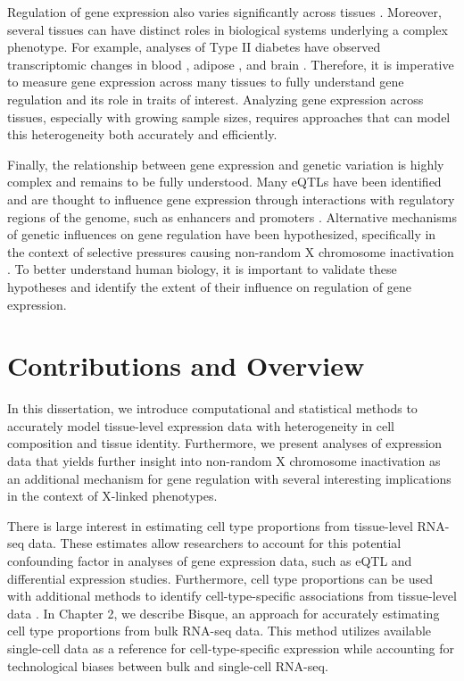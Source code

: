 Regulation of gene expression also varies significantly across tissues \cite{GTEx_Consortium2020-xx}. Moreover, several tissues can have distinct roles in biological systems underlying a complex phenotype. For example, analyses of Type II diabetes have observed transcriptomic changes in blood \cite{Christodoulou2019}, adipose \cite{Miao2020}, and brain \cite{Zhou2019}. Therefore, it is imperative to measure gene expression across many tissues to fully understand gene regulation and its role in traits of interest. Analyzing gene expression across tissues, especially with growing sample sizes, requires approaches that can model this heterogeneity both accurately and efficiently.

Finally, the relationship between gene expression and genetic variation is highly complex \cite{robert2018exploring} and remains to be fully understood. Many eQTLs have been identified and are thought to influence gene expression through interactions with regulatory regions of the genome, such as enhancers and promoters \cite{Garieri2017}. Alternative mechanisms of genetic influences on gene regulation have been hypothesized, specifically in the context of selective pressures causing non-random X chromosome inactivation \cite{Migeon1998-gc}. To better understand human biology, it is important to validate these hypotheses and identify the extent of their influence on regulation of gene expression. 

\section{Contributions and Overview}
In this dissertation, we introduce computational and statistical methods to accurately model tissue-level expression data with heterogeneity in cell composition and tissue identity. Furthermore, we present analyses of expression data that yields further insight into non-random X chromosome inactivation as an additional mechanism for gene regulation with several interesting implications in the context of X-linked phenotypes.

There is large interest in estimating cell type proportions from tissue-level RNA-seq data. These estimates allow researchers to account for this potential confounding factor in analyses of gene expression data, such as eQTL and differential expression studies. Furthermore, cell type proportions can be used with additional methods to identify cell-type-specific associations from tissue-level data \cite{Shen-Orr2010-tg}. In Chapter 2, we describe Bisque, an approach for accurately estimating cell type proportions from bulk RNA-seq data. This method utilizes available single-cell data as a reference for cell-type-specific expression while accounting for technological biases between bulk and single-cell RNA-seq.

